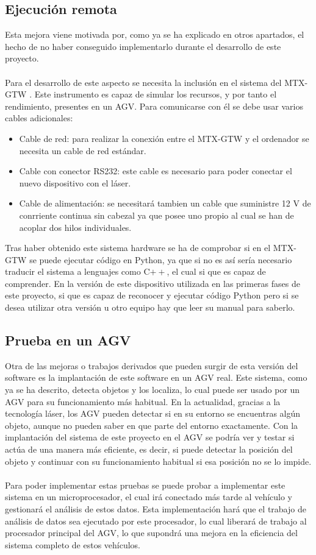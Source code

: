 \subsection{Ejecución remota}
Esta mejora viene motivada por, como ya se ha explicado en otros apartados, el hecho de no haber conseguido implementarlo durante el desarrollo de este proyecto.\\
\\
Para el desarrollo de este aspecto se necesita la inclusión en el sistema del MTX-GTW \citep{hardware MTX-GTW}. Este instrumento es capaz de simular los recursos, y por tanto el rendimiento, presentes en un AGV. Para comunicarse con él se debe usar varios cables adicionales:
\begin{itemize}
	\item Cable de red: para realizar la conexión entre el MTX-GTW y el ordenador se necesita un cable de red estándar.
	\item Cable con conector RS232: este cable es necesario para poder conectar el nuevo dispositivo con el láser.
	\item Cable de alimentación: se necesitará tambien un cable que suministre 12 V de conrriente continua sin cabezal ya que posee uno propio al cual se han de acoplar dos hilos individuales.
\end{itemize}
Tras haber obtenido este sistema hardware se ha de comprobar si en el MTX-GTW se puede ejecutar código en Python, ya que si no es así sería necesario traducir el sistema a lenguajes como C$++$, el cual si que es capaz de comprender. En la versión de este dispositivo utilizada en las primeras fases de este proyecto, si que es capaz de reconocer y ejecutar código Python pero si se desea utilizar otra versión u otro equipo hay que leer su manual para saberlo.

\subsection{Prueba en un AGV}

Otra de las mejoras o trabajos derivados que pueden surgir de esta versión del software es la implantación de este software en un AGV real. Este sistema, como ya se ha descrito, detecta objetos y los localiza, lo cual puede ser usado por un AGV para su funcionamiento más habitual. En la actualidad, gracias a la tecnología láser, los AGV pueden detectar si en su entorno se encuentras algún objeto, aunque no pueden saber en que parte del entorno exactamente. Con la implantación del sistema de este proyecto en el AGV se podría ver y testar si actúa de una manera más eficiente, es decir, si puede detectar la posición del objeto y continuar con su funcionamiento habitual si esa posición no se lo impide.\\
\\
Para poder implementar estas pruebas se puede probar a implementar este sistema en un microprocesador, el cual irá conectado más tarde al vehículo y gestionará el análisis de estos datos. Esta implementación hará que el trabajo de análisis de datos sea ejecutado por este procesador, lo cual liberará de trabajo al procesador principal del AGV, lo que supondrá una mejora en la eficiencia del sistema completo de estos vehículos.